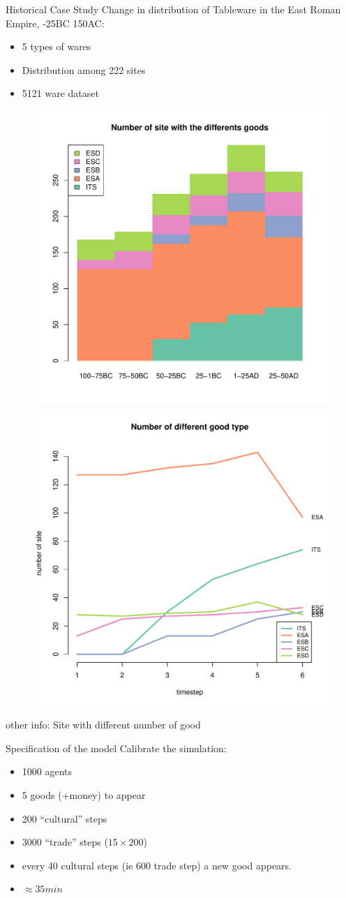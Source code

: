 \documentclass[12pt, notes=show]{beamer}
\begin{document}
\begin{frame}{Historical Case Study}
    \footnotesize
    \vspace{.5cm}
Change in distribution of Tableware in the East Roman Empire, -25BC 150AC:
    \begin{itemize}
	\item 5 types of wares 
	\item Distribution among 222 sites
	\item 5121 ware dataset
 \end{itemize}

 \begin{figure}
     \includegraphics[width=.45\textwidth]{../images/hmNbSiteWGoodData.pdf}
     \includegraphics[width=.45\textwidth]{../images/plotNbSiteWGoodData.pdf}
     
 \end{figure}
 \begin{center}
     \tiny other info: Site with different number of good
 \end{center}
\end{frame}

\begin{frame}{Specification of the model}
    Calibrate the simulation:
    \begin{itemize}
	\item 1000 agents
	\item 5 goods (+money) to appear 
	\item 200 ``cultural'' steps 
	\item 3000 ``trade'' steps ($15\times200$)
	\item every 40 cultural steps (ie $600$ trade step) a new good appears.
	\item $\approx 35min$
    \end{itemize}
\end{frame}
\end{document}
